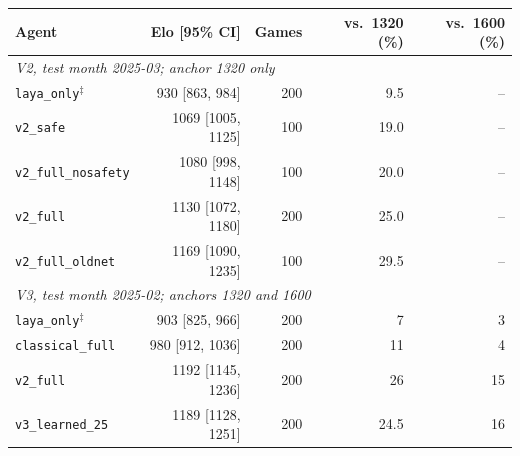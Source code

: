 \scriptsize\setlength{\tabcolsep}{2.2pt}\begin{tabular}{lrrrr}\toprule
Agent & Elo [95\% CI] & Games & vs.\ 1320 (\%) & vs.\ 1600 (\%) \\
\midrule
\multicolumn{5}{l}{\textit{V2, test month 2025-03; anchor 1320 only}}\\
\texttt{laya\_only}$^{\ddagger}$ & 930 [863, 984] & 200 & 9.5 & -- \\
\texttt{v2\_safe} & 1069 [1005, 1125] & 100 & 19.0 & -- \\
\texttt{v2\_full\_nosafety} & 1080 [998, 1148] & 100 & 20.0 & -- \\
\texttt{v2\_full} & 1130 [1072, 1180] & 200 & 25.0 & -- \\
\texttt{v2\_full\_oldnet} & 1169 [1090, 1235] & 100 & 29.5 & -- \\
\midrule\multicolumn{5}{l}{\textit{V3, test month 2025-02; anchors 1320 and 1600}}\\
\texttt{laya\_only}$^{\ddagger}$ & 903 [825, 966] & 200 & 7 & 3 \\
\texttt{classical\_full} & 980 [912, 1036] & 200 & 11 & 4 \\
\texttt{v2\_full} & 1192 [1145, 1236] & 200 & 26 & 15 \\
\texttt{v3\_learned\_25} & 1189 [1128, 1251] & 200 & 24.5 & 16 \\
\bottomrule\end{tabular}
